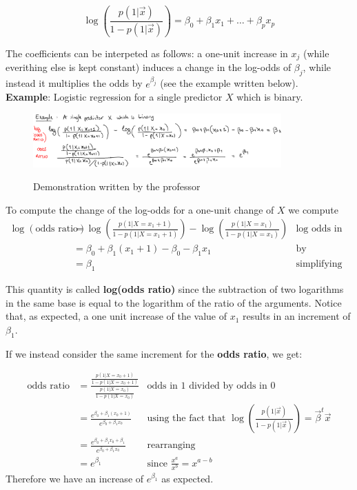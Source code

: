     $$\log\left(\frac{p(1|\vec{x})}{1 - p(1|\vec{x})}\right) = \beta_0 + \beta_1
    x_1 + \dots + \beta_px_p $$
    
    The coefficients can be interpeted as follows: a one-unit increase in $x_j$
    (while everithing else is kept constant) induces a change in the log-odds of
    $\beta_j$, while instead it multiplies the odds by $e^{\beta_j}$ (see the
    example written below). \\

    \noindent\textbf{Example}: Logistic regression for a single predictor $X$
    which is binary.

    \begin{figure}[ht]
      \caption{Demonstration written by the professor}
      \centering
      \includegraphics[width=0.85\textwidth]{demonstrationLogoddsChange}
      \label{logoddchange}
      \end{figure}

    To compute the change of the log-odds for a one-unit change of $X$ we
    compute
    \begin{align*}
    \log(\text{odds ratio})
      & = \log\left(\frac{p(1|X=x_1+1)}{1-p(1|X=x_1+1)}\right)-\log\left(\frac{p(1|X=x_1)}{1-p(1|X=x_1)}\right)
      & \text{log odds in 1 minus log odds in 0}\\
      & = \beta_0 + \beta_1 (x_1 + 1) - \beta_0 - \beta_1x_1 
      & \text{by definition of logistic regression}\\
      & = \beta_1
      & \text{simplifying}
\end{align*}
 
    This quantity is called \textbf{log(odds ratio)} since the subtraction of
    two logarithms in the same base is equal to the logarithm of the ratio of
    the arguments. Notice that, as expected, a one unit increase of the value of
    $x_1$ results in an increment of \textbf{$\beta_1$}.

    If we instead consider the same increment for the \textbf{odds ratio}, we
    get:

    \begin{align*}
      \text{odds ratio}
      & = \frac{\frac{p(1|X=x_0+1)}{1-p(1|X=x_0+1)}}{\frac{p(1|X=x_0)}{1-p(1|X=x_0)}} 
      & \text{odds in 1 divided by odds in 0}\\
      & = \frac{e^{\beta_0 + \beta_1 (x_0 + 1)}}{e^{\beta_0 + \beta_1 x_0}}
      & \text{using the fact that } \log\left(\frac{p(1|\vec{x})}{1 - p(1|\vec{x})}\right)= \vec{\beta}^t\vec{x}\\
      & = \frac{e^{\beta_0 + \beta_1x_0 + \beta_1}}{e^{\beta_0 + \beta_1 x_0}} 
      & \text{rearranging}\\
      & = e^{\beta_1}
      & \text{since } \frac{x^a}{x^b} = x^{a-b}
    \end{align*}
    Therefore we have an increase of \textbf{$e^{\beta_1}$} as expected.

